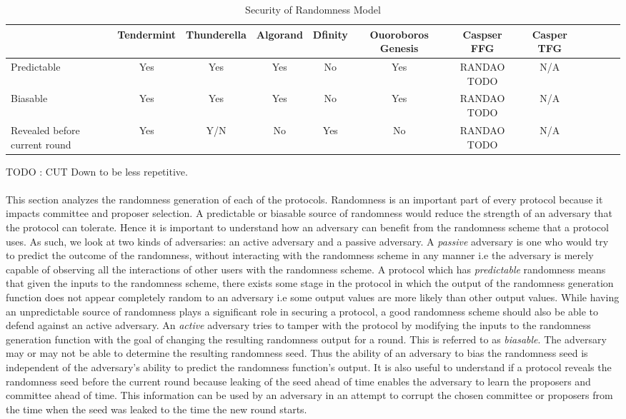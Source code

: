 \documentclass[10pt,journal,compsoc]{IEEEtran}
\begin{document}
\begin{table*}[htdp]
 \caption{Security of Randomness Model}
\label{}
\begin{tabularx}{\textwidth}{@{}l*{10}{C}c@{}}
\toprule
                 & Tendermint & Thunderella & Algorand & Dfinity & Ouoroboros Genesis  & Caspser FFG & Casper TFG   \\ 
\midrule
Predictable    & Yes  &  Yes & Yes   & No & Yes & RANDAO TODO & N/A   \\
\addlinespace
Biasable & Yes   & Yes  & Yes & No & Yes & RANDAO TODO & N/A \\ 
\addlinespace
Revealed before current round & Yes  & Y/N  & No & Yes & No & RANDAO TODO & N/A\\ 
\bottomrule
\end{tabularx}
\end{table*}
TODO : CUT Down to be less repetitive. 
\\\\
This section analyzes the randomness generation of each of the protocols. Randomness is an important part of every protocol because it impacts committee and proposer selection. A predictable or biasable source of randomness would reduce the strength of an adversary that the protocol can tolerate. Hence it is important to understand how an adversary can benefit from the randomness scheme that a protocol uses. As such, we look at two kinds of adversaries: an active adversary and a passive adversary. A \emph{passive} adversary is one who would try to predict the outcome of the randomness, without interacting with the randomness scheme in any manner i.e the adversary is merely capable of observing all the interactions of other users with the randomness scheme. A protocol which has \emph{predictable} randomness means that given the inputs to the randomness scheme, there exists some stage in the protocol in which the output of the randomness generation function does not appear completely random to an adversary i.e some output values are more likely than other output values. While having an unpredictable source of randomness plays a significant role in securing a protocol, a good randomness scheme should also be able to defend against an active adversary. An \emph{active} adversary tries to tamper with the protocol by modifying the inputs to the randomness generation function with the goal of changing the resulting randomness output for a round. This is referred to as \emph{biasable}. The adversary may or may not be able to determine the resulting randomness seed. Thus the ability of an adversary to bias the randomness seed is independent of the adversary's ability to predict the randomness function's output. It is also useful to understand if a protocol reveals the randomness seed before the current round because leaking of the seed ahead of time enables the adversary to learn the proposers and committee ahead of time. This information can be used by an adversary in an attempt to corrupt the chosen committee or proposers from the time when the seed was leaked to the time the new round starts.
\end{document}
